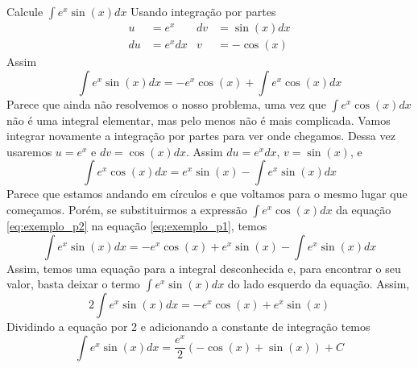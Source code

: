 \begin{example}
  Calcule \(\int e^x \sin(x) dx\)
  \solution
  Usando integração por partes
  \begin{align*}
    u  & = e^x   & dv & = \sin(x) dx \\
    du & = e^xdx & v  & = -\cos(x)
  \end{align*}
  Assim
  \begin{equation}
    \label{eq:exemplo_p1}
    \int e^x \sin(x) dx = -e^x \cos(x)+ \int e^x \cos(x)dx
  \end{equation}
  Parece que ainda não resolvemos o nosso problema, uma vez que
  $\int e^x \cos(x) dx$ não é uma integral elementar, mas pelo menos
  não é mais complicada. Vamos integrar novamente a integração por
  partes para ver onde chegamos. Dessa vez usaremos $u=e^x$ e
  $dv=\cos(x)dx$. Assim $du=e^x dx$, $v=\sin(x)$, e
  \begin{equation}
    \label{eq:exemplo_p2}
    \int e^x \cos(x) dx= e^x \sin(x)-\int e^x \sin(x) dx
  \end{equation}
  Parece que estamos andando em círculos e que voltamos para o
  mesmo lugar que começamos.
  Porém, se substituirmos a expressão $\int e^x \cos(x)dx$ da
  equação \eqref{eq:exemplo_p2} na
  equação \eqref{eq:exemplo_p1}, temos
  \[
    \int e^x \sin(x) dx
    = -e^x \cos(x)+ e^x \sin(x)-\int e^x \sin(x) dx
  \]
  Assim, temos uma equação para a integral desconhecida e,
  para encontrar o seu valor, basta deixar o termo
  $\int e^x \sin(x) dx$ do lado esquerdo da equação. Assim,
  \[
    2\int e^x \sin(x) dx = -e^x \cos(x)+ e^x \sin(x)
  \]
  Dividindo a equação por 2 e adicionando a constante de integração temos
  \[
    \int e^x \sin(x) dx = \frac{e^x}{2}( -\cos(x) +\sin(x))+ C
  \]
\end{example}

